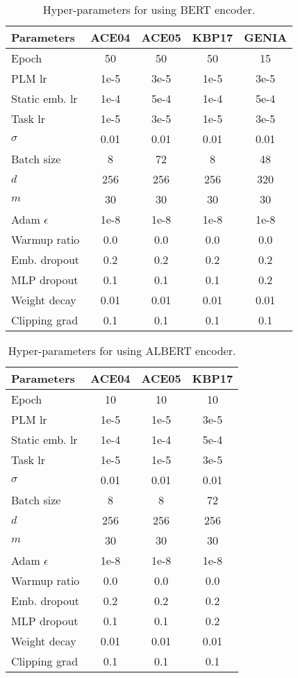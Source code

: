 \documentclass[11pt]{article}
\begin{document}
\begin{table}[ht]
\centering
\small
\begin{tabular}{lcccc}
\toprule
Parameters & ACE04 & ACE05 & KBP17 & GENIA \\
\midrule
Epoch & 50 & 50 & 50 & 15 \\
PLM lr & 1e-5 & 3e-5 & 1e-5 & 3e-5 \\
Static emb. lr & 1e-4 & 5e-4 & 1e-4 & 5e-4 \\
Task lr & 1e-5 & 3e-5 & 1e-5 & 3e-5 \\
$\sigma$ & 0.01 & 0.01 & 0.01 & 0.01 \\
Batch size & 8 & 72 &8 & 48 \\
$d$ & 256 & 256 & 256 & 320 \\
$m$ & 30 & 30 & 30 & 30  \\
Adam $\epsilon$ & 1e-8 & 1e-8 & 1e-8 & 1e-8\\
Warmup ratio & 0.0 & 0.0 & 0.0 & 0.0   \\
Emb. dropout & 0.2  & 0.2  & 0.2  & 0.2 \\
MLP dropout & 0.1 & 0.1 & 0.1 & 0.2 \\
Weight decay & 0.01 & 0.01 & 0.01 & 0.01 \\
Clipping grad & 0.1 & 0.1 & 0.1 & 0.1 \\
\bottomrule
\end{tabular}
\caption{Hyper-parameters for using BERT encoder.
}
\label{hyper para}
\end{table}

\begin{table}[ht]
\centering
\small
\begin{tabular}{lccc}
\toprule
Parameters & ACE04 & ACE05 & KBP17 \\
\midrule
Epoch & 10 & 10 & 10 \\
PLM lr & 1e-5 & 1e-5 & 3e-5 \\
Static emb. lr & 1e-4 & 1e-4  & 5e-4 \\
Task lr & 1e-5 & 1e-5  & 3e-5 \\
$\sigma$ & 0.01 & 0.01 & 0.01\\
Batch size & 8 & 8 & 72 \\
$d$ & 256 & 256 & 256 \\
$m$ & 30 & 30 & 30 \\
Adam $\epsilon$ & 1e-8 & 1e-8 & 1e-8  \\
Warmup ratio &  0.0 & 0.0 & 0.0 \\
Emb. dropout &0.2  & 0.2  & 0.2 \\
MLP dropout & 0.1 & 0.1  & 0.2 \\
Weight decay & 0.01 & 0.01 & 0.01 \\
Clipping grad &0.1 & 0.1 & 0.1 \\
\bottomrule
\end{tabular}
\caption{Hyper-parameters for using ALBERT encoder.
}
\label{hyper para albert}
\end{table}
\end{document}
